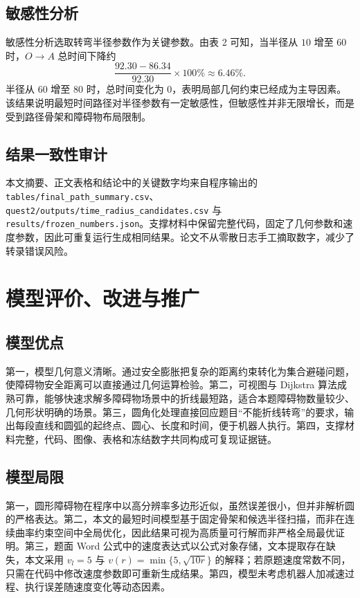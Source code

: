 \documentclass[UTF8,a4paper,12pt]{ctexart}
\begin{document}
\subsection{敏感性分析}
敏感性分析选取转弯半径参数作为关键参数。由表 2 可知，当半径从 $10$ 增至 $60$ 时，$O\to A$ 总时间下降约
\begin{equation}
\frac{92.30-86.34}{92.30}\times100\%\approx6.46\%.
\end{equation}
半径从 $60$ 增至 $80$ 时，总时间变化为 $0$，表明局部几何约束已经成为主导因素。该结果说明最短时间路径对半径参数有一定敏感性，但敏感性并非无限增长，而是受到路径骨架和障碍物布局限制。

\subsection{结果一致性审计}
本文摘要、正文表格和结论中的关键数字均来自程序输出的 \texttt{tables/final\_path\_summary.csv}、\texttt{quest2/outputs/time\_radius\_candidates.csv} 与 \texttt{results/frozen\_numbers.json}。支撑材料中保留完整代码，固定了几何参数和速度参数，因此可重复运行生成相同结果。论文不从零散日志手工摘取数字，减少了转录错误风险。

\section{模型评价、改进与推广}
\subsection{模型优点}
第一，模型几何意义清晰。通过安全膨胀把复杂的距离约束转化为集合避碰问题，使障碍物安全距离可以直接通过几何运算检验。第二，可视图与 Dijkstra 算法成熟可靠，能够快速求解多障碍物场景中的折线最短路，适合本题障碍物数量较少、几何形状明确的场景。第三，圆角化处理直接回应题目“不能折线转弯”的要求，输出每段直线和圆弧的起终点、圆心、长度和时间，便于机器人执行。第四，支撑材料完整，代码、图像、表格和冻结数字共同构成可复现证据链。

\subsection{模型局限}
第一，圆形障碍物在程序中以高分辨率多边形近似，虽然误差很小，但并非解析圆的严格表达。第二，本文的最短时间模型基于固定骨架和候选半径扫描，而非在连续曲率约束空间中全局优化，因此结果可视为高质量可行解而非严格全局最优证明。第三，题面 Word 公式中的速度表达式以公式对象存储，文本提取存在缺失，本文采用 $v_l=5$ 与 $v(r)=\min\{5,\sqrt{10r}\}$ 的解释；若原题速度常数不同，只需在代码中修改速度参数即可重新生成结果。第四，模型未考虑机器人加减速过程、执行误差随速度变化等动态因素。
\end{document}
